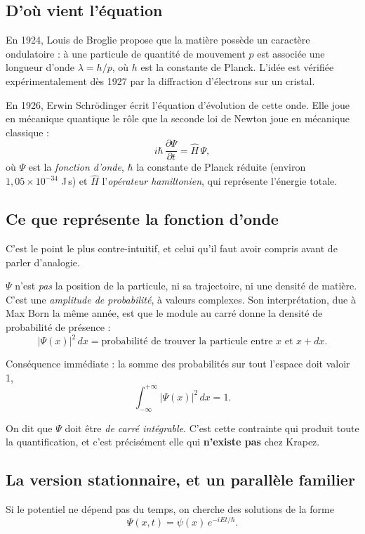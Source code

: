 \documentclass[11pt,a4paper]{article}
\begin{document}
\subsection{D'où vient l'équation}

En 1924, Louis de Broglie propose que la matière possède un caractère ondulatoire : à une particule de
quantité de mouvement $p$ est associée une longueur d'onde $\lambda = h/p$, où $h$ est la constante de
Planck. L'idée est vérifiée expérimentalement dès 1927 par la diffraction d'électrons sur un cristal.

En 1926, Erwin Schrödinger écrit l'équation d'évolution de cette onde. Elle joue en mécanique quantique
le rôle que la seconde loi de Newton joue en mécanique classique :
\[ i\hbar\,\frac{\partial\Psi}{\partial t} = \hat{H}\,\Psi , \]
où $\Psi$ est la \emph{fonction d'onde}, $\hbar$ la constante de Planck réduite (environ
$1{,}05\times10^{-34}$ J\,s) et $\hat{H}$ l'\emph{opérateur hamiltonien}, qui représente l'énergie
totale.

\subsection{Ce que représente la fonction d'onde}

C'est le point le plus contre-intuitif, et celui qu'il faut avoir compris avant de parler d'analogie.

$\Psi$ n'est \emph{pas} la position de la particule, ni sa trajectoire, ni une densité de matière.
C'est une \emph{amplitude de probabilité}, à valeurs complexes. Son interprétation, due à Max Born la
même année, est que le module au carré donne la densité de probabilité de présence :
\[ |\Psi(x)|^{2}\,dx = \text{probabilité de trouver la particule entre } x \text{ et } x+dx . \]

Conséquence immédiate : la somme des probabilités sur tout l'espace doit valoir 1,
\[ \int_{-\infty}^{+\infty} |\Psi(x)|^{2}\,dx = 1 . \]

On dit que $\Psi$ doit être \emph{de carré intégrable}. C'est cette contrainte qui produit toute la
quantification, et c'est précisément elle qui \textbf{n'existe pas} chez Krapez.

\subsection{La version stationnaire, et un parallèle familier}

Si le potentiel ne dépend pas du temps, on cherche des solutions de la forme
\[ \Psi(x,t) = \psi(x)\,e^{-iEt/\hbar} . \]
\end{document}
